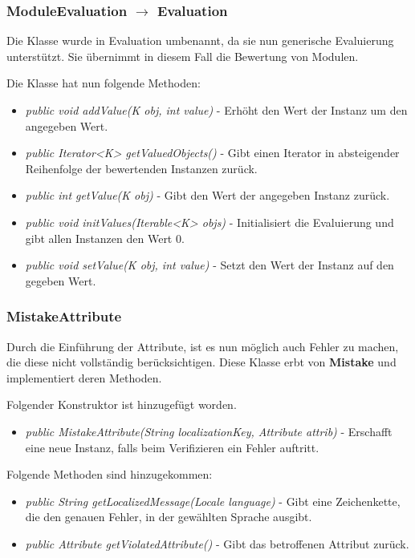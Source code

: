 \documentclass[parskip=full]{scrartcl}
\begin{document}
			\hypertarget{model:Evaluation}{}
			\subsubsection{ModuleEvaluation $\rightarrow $ Evaluation}
				
				Die Klasse wurde in Evaluation umbenannt, da sie nun generische Evaluierung unterstützt. Sie übernimmt in diesem Fall die Bewertung von Modulen.
				
				Die Klasse hat nun folgende Methoden:
				\begin{itemize}
					\item \textit{public void addValue(K obj, int value)} - Erhöht den Wert der Instanz um den angegeben Wert.
					\item \textit{public Iterator<K> getValuedObjects()} - Gibt einen Iterator in absteigender Reihenfolge der bewertenden Instanzen zurück.
					\item \textit{public int getValue(K obj)} - Gibt den Wert der angegeben Instanz zurück.
					\item \textit{public void initValues(Iterable<K> objs)} - Initialisiert die Evaluierung und gibt allen Instanzen den Wert 0.
					\item \textit{public void setValue(K obj, int value)} - Setzt den Wert der Instanz auf den gegeben Wert.
				\end{itemize}
				
			\subsubsection{MistakeAttribute}
				Durch die Einführung der Attribute, ist es nun möglich auch Fehler zu machen, die diese nicht vollständig berücksichtigen. Diese Klasse erbt von \textbf{Mistake} und implementiert deren Methoden.
				
				Folgender Konstruktor ist hinzugefügt worden.
				\begin{itemize}
					\item \textit{public MistakeAttribute(String localizationKey, Attribute attrib)} - Erschafft eine neue Instanz, falls beim Verifizieren ein Fehler auftritt. 
				\end{itemize}
				
				Folgende Methoden sind hinzugekommen:
				\begin{itemize}
					\item \textit{public String getLocalizedMessage(Locale language)} - Gibt eine Zeichenkette, die den genauen Fehler, in der gewählten Sprache ausgibt.
					\item \textit{public Attribute getViolatedAttribute()} - Gibt das betroffenen Attribut zurück.
				\end{itemize}
				
\end{document}

